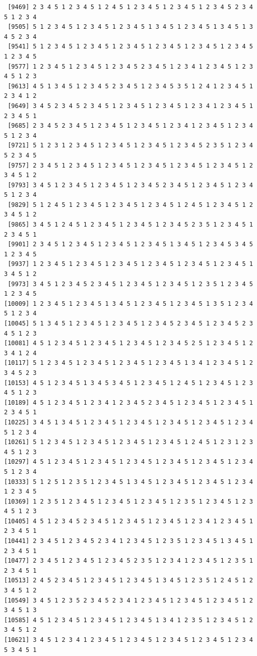 \documentclass[
  english,
]{book}
\begin{document}
\begin{verbatim}
 [9469] 2 3 4 5 1 2 3 4 5 1 2 4 5 1 2 3 4 5 1 2 3 4 5 1 2 3 4 5 2 3 4 5 1 2 3 4
 [9505] 5 1 2 3 4 5 1 2 3 4 5 1 2 3 4 5 1 3 4 5 1 2 3 4 5 1 3 4 5 1 3 4 5 2 3 4
 [9541] 5 1 2 3 4 5 1 2 3 4 5 1 2 3 4 5 1 2 3 4 5 1 2 3 4 5 1 2 3 4 5 1 2 3 4 5
 [9577] 1 2 3 4 5 1 2 3 4 5 1 2 3 4 5 2 3 4 5 1 2 3 4 1 2 3 4 5 1 2 3 4 5 1 2 3
 [9613] 4 5 1 3 4 5 1 2 3 4 5 2 3 4 5 1 2 3 4 5 3 5 1 2 4 1 2 3 4 5 1 2 3 4 1 2
 [9649] 3 4 5 2 3 4 5 2 3 4 5 1 2 3 4 5 1 2 3 4 5 1 2 3 4 1 2 3 4 5 1 2 3 4 5 1
 [9685] 2 3 4 5 2 3 4 5 1 2 3 4 5 1 2 3 4 5 1 2 3 4 1 2 3 4 5 1 2 3 4 5 1 2 3 4
 [9721] 5 1 2 3 1 2 3 4 5 1 2 3 4 5 1 2 3 4 5 1 2 3 4 5 2 3 5 1 2 3 4 5 2 3 4 5
 [9757] 2 3 4 5 1 2 3 4 5 1 2 3 4 5 1 2 3 4 5 1 2 3 4 5 1 2 3 4 5 1 2 3 4 5 1 2
 [9793] 3 4 5 1 2 3 4 5 1 2 3 4 5 1 2 3 4 5 2 3 4 5 1 2 3 4 5 1 2 3 4 5 1 2 3 4
 [9829] 5 1 2 4 5 1 2 3 4 5 1 2 3 4 5 1 2 3 4 5 1 2 4 5 1 2 3 4 5 1 2 3 4 5 1 2
 [9865] 3 4 5 1 2 4 5 1 2 3 4 5 1 2 3 4 5 1 2 3 4 5 2 3 5 1 2 3 4 5 1 2 3 4 5 1
 [9901] 2 3 4 5 1 2 3 4 5 1 2 3 4 5 1 2 3 4 5 1 3 4 5 1 2 3 4 5 3 4 5 1 2 3 4 5
 [9937] 1 2 3 4 5 1 2 3 4 5 1 2 3 4 5 1 2 3 4 5 1 2 3 4 5 1 2 3 4 5 1 3 4 5 1 2
 [9973] 3 4 5 1 2 3 4 5 2 3 4 5 1 2 3 4 5 1 2 3 4 5 1 2 3 5 1 2 3 4 5 1 2 3 4 5
[10009] 1 2 3 4 5 1 2 3 4 5 1 3 4 5 1 2 3 4 5 1 2 3 4 5 1 3 5 1 2 3 4 5 1 2 3 4
[10045] 5 1 3 4 5 1 2 3 4 5 1 2 3 4 5 1 2 3 4 5 2 3 4 5 1 2 3 4 5 2 3 4 5 1 2 3
[10081] 4 5 1 2 3 4 5 1 2 3 4 5 1 2 3 4 5 1 2 3 4 5 2 5 1 2 3 4 5 1 2 3 4 1 2 4
[10117] 5 1 2 3 4 5 1 2 3 4 5 1 2 3 4 5 1 2 3 4 5 1 3 4 1 2 3 4 5 1 2 3 4 5 2 3
[10153] 4 5 1 2 3 4 5 1 3 4 5 3 4 5 1 2 3 4 5 1 2 4 5 1 2 3 4 5 1 2 3 4 5 1 2 3
[10189] 4 5 1 2 3 4 5 1 2 3 4 1 2 3 4 5 2 3 4 5 1 2 3 4 5 1 2 3 4 5 1 2 3 4 5 1
[10225] 3 4 5 1 3 4 5 1 2 3 4 5 1 2 3 4 5 1 2 3 4 5 1 2 3 4 5 1 2 3 4 5 1 2 3 4
[10261] 5 1 2 3 4 5 1 2 3 4 5 1 2 3 4 5 1 2 3 4 5 1 2 4 5 1 2 3 1 2 3 4 5 1 2 3
[10297] 4 5 1 2 3 4 5 1 2 3 4 5 1 2 3 4 5 1 2 3 4 5 1 2 3 4 5 1 2 3 4 5 1 2 3 4
[10333] 5 1 2 5 1 2 3 5 1 2 3 4 5 1 3 4 5 1 2 3 4 5 1 2 3 4 5 1 2 3 4 1 2 3 4 5
[10369] 1 2 3 5 1 2 3 4 5 1 2 3 4 5 1 2 3 4 5 1 2 3 5 1 2 3 4 5 1 2 3 4 5 1 2 3
[10405] 4 5 1 2 3 4 5 2 3 4 5 1 2 3 4 5 1 2 3 4 5 1 2 3 4 1 2 3 4 5 1 2 3 4 5 1
[10441] 2 3 4 5 1 2 3 4 5 2 3 4 1 2 3 4 5 1 2 3 5 1 2 3 4 5 1 3 4 5 1 2 3 4 5 1
[10477] 2 3 4 5 1 2 3 4 5 1 2 3 4 5 2 3 5 1 2 3 4 1 2 3 4 5 1 2 3 5 1 2 3 4 5 1
[10513] 2 4 5 2 3 4 5 1 2 3 4 5 1 2 3 4 5 1 3 4 5 1 2 3 5 1 2 4 5 1 2 3 4 5 1 2
[10549] 3 4 5 1 2 3 5 2 3 4 5 2 3 4 1 2 3 4 5 1 2 3 4 5 1 2 3 4 5 1 2 3 4 5 1 3
[10585] 4 5 1 2 3 4 5 1 2 3 4 5 1 2 3 4 5 1 3 4 1 2 3 5 1 2 3 4 5 1 2 3 4 5 1 2
[10621] 3 4 5 1 2 3 4 1 2 3 4 5 1 2 3 4 5 1 2 3 4 5 1 2 3 4 5 1 2 3 4 5 3 4 5 1

\end{verbatim}
\end{document}
